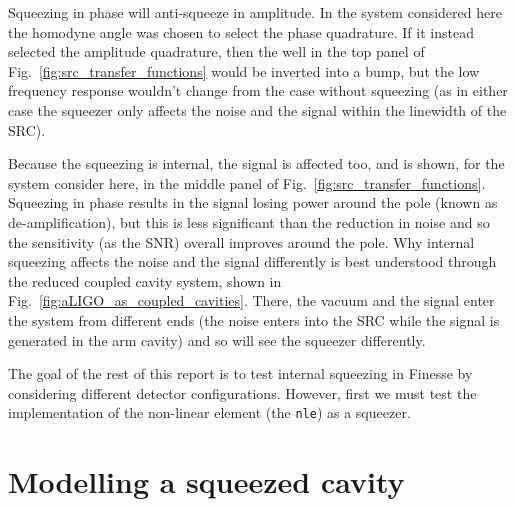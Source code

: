 \documentclass[aps,pra,superscriptaddress,reprint,nofootinbib]{revtex4-1}
\newcommand{\code}[1]{\texttt{#1}}
\begin{document}
Squeezing in phase will anti-squeeze in amplitude. In the system considered here the homodyne angle was chosen to select the phase quadrature. If it instead selected the amplitude quadrature, then the well in the top panel of Fig.~\ref{fig:src_transfer_functions} would be inverted into a bump, but the low frequency response wouldn’t change from the case without squeezing (as in either case the squeezer only affects the noise and the signal within the linewidth of the SRC).

Because the squeezing is internal, the signal is affected too, and is shown, for the system consider here, in the middle panel of Fig.~\ref{fig:src_transfer_functions}. Squeezing in phase results in the signal losing power around the pole (known as de-amplification), but this is less significant than the reduction in noise and so the sensitivity (as the SNR) overall improves around the pole.
Why internal squeezing affects the noise and the signal differently is best understood through the reduced coupled cavity system, shown in Fig.~\ref{fig:aLIGO_as_coupled_cavities}. There, the vacuum and the signal enter the system from different ends (the noise enters into the SRC while the signal is generated in the arm cavity) and so will see the squeezer differently.


The goal of the rest of this report is to test internal squeezing in Finesse by considering different detector configurations. However, first we must test the implementation of the non-linear element (the \code{nle}) as a squeezer.


\section{Modelling a squeezed cavity} %
\label{sec:sqzcavity}
\end{document}
